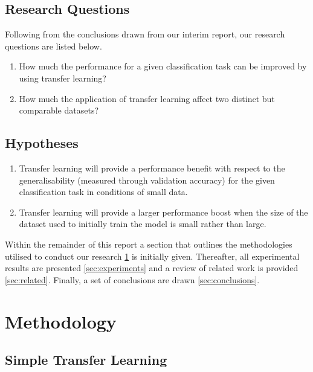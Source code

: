 \documentclass{article}
\begin{document}
\subsection{Research Questions}
\label{sec:questions}

Following from the conclusions drawn from our interim report, our research questions are listed below.

\begin{enumerate}
  \item How much the performance for a given classification task can be improved by using transfer learning?  
  \item How much the application of transfer learning affect two distinct but comparable datasets?
\end{enumerate}

\subsection{Hypotheses}
\label{sec:hypotheses}
\begin{enumerate}[label=\textbf{H.\arabic*}]
  \item \label{h:1} Transfer learning will provide a performance benefit with respect to the generalisability (measured through validation accuracy) for the given classification task in conditions of small data.
  \item \label{h:2} Transfer learning will provide a larger performance boost when the size of the dataset used to initially train the model is small rather than large.
\end{enumerate}

Within the remainder of this report a section that outlines the methodologies utilised to conduct our research \ref{sec:methodology} is initially given. Thereafter, all experimental results are presented \ref{sec:experiments} and a review of related work is provided \ref{sec:related}. Finally, a set of conclusions are drawn \ref{sec:conclusions}.

\section{Methodology}
\label{sec:methodology}

\subsection{Simple Transfer Learning}
\label{sec:transferlearninng}
\end{document}
